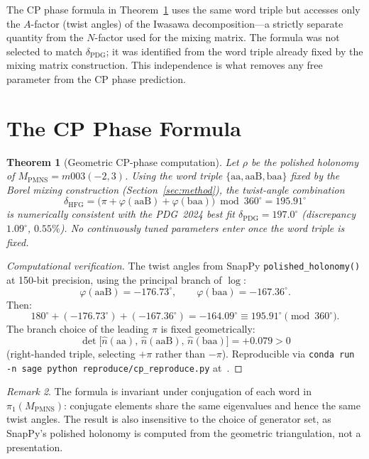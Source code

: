 \documentclass[11pt,a4paper]{article}
\newtheorem{theorem}{Theorem}
\theoremstyle{definition}
\theoremstyle{remark}
\newtheorem{remark}[theorem]{Remark}
\newcommand{\MPMNS}{M_{\mathrm{PMNS}}}
\begin{document}
The CP phase formula in Theorem~\ref{thm:main} uses the same word
triple but accesses only the $A$-factor (twist angles) of the
Iwasawa decomposition---a strictly separate quantity from the
$N$-factor used for the mixing matrix.
The formula was not selected to match $\delta_{\mathrm{PDG}}$;
it was identified from the word triple already fixed by the
mixing matrix construction.
This independence is what removes any free parameter from the
CP phase prediction.

\section{The CP Phase Formula}
\label{sec:formula}

\begin{theorem}[Geometric CP-phase computation]
\label{thm:main}
Let $\rho$ be the polished holonomy of $\MPMNS=m003(-2,3)$.
Using the word triple $\{\mathrm{aa},\mathrm{aaB},\mathrm{baa}\}$
fixed by the Borel mixing construction (Section~\ref{sec:method}),
the twist-angle combination
\[
  \delta_{\mathrm{HFG}}
  = \bigl(\pi + \varphi(\mathrm{aaB}) + \varphi(\mathrm{baa})\bigr)
    \bmod 360^\circ
  = 195.91^\circ
\]
is numerically consistent with the PDG~2024 best fit
$\delta_{\mathrm{PDG}}=197.0^\circ$ (discrepancy $1.09^\circ$,
$0.55\%$).
No continuously tuned parameters enter once the word triple is fixed.
\end{theorem}

\begin{proof}[Computational verification]
The twist angles from SnapPy \texttt{polished\_holonomy()}
at 150-bit precision, using the principal branch of $\log$:
\[
  \varphi(\mathrm{aaB}) = -176.73^\circ,
  \qquad
  \varphi(\mathrm{baa}) = -167.36^\circ.
\]
Then:
\[
  180^\circ + (-176.73^\circ) + (-167.36^\circ)
  = -164.09^\circ
  \equiv 195.91^\circ \pmod{360^\circ}.
\]
The branch choice of the leading $\pi$ is fixed geometrically:
\[
  \det\bigl[\hat{n}(\mathrm{aa}),\,\hat{n}(\mathrm{aaB}),\,
  \hat{n}(\mathrm{baa})\bigr] = +0.079 > 0
\]
(right-handed triple, selecting $+\pi$ rather than $-\pi$).
Reproducible via
\texttt{conda run -n sage python reproduce/cp\_reproduce.py}
at~\cite{GitHub}.
\end{proof}

\begin{remark}
The formula is invariant under conjugation of each word in
$\pi_1(\MPMNS)$: conjugate elements share the same eigenvalues
and hence the same twist angles.
The result is also insensitive to the choice of generator set,
as SnapPy's polished holonomy is computed from the geometric
triangulation, not a presentation.
\end{remark}
\end{document}
